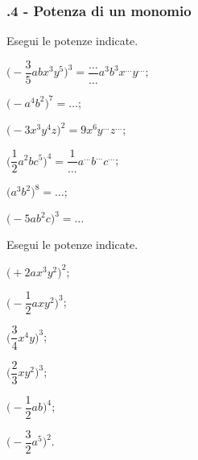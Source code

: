\subsubsection*{\thechapter.4 - Potenza di un monomio}
\begin{esercizio}
 \label{ese:10.16} %
 Esegui le potenze indicate.
\begin{multicols}{2}
\begin{enumeratea}
\spazielenx
 \item $\bigg(-{\dfrac{3}{5}}abx^{3}y^{5}\bigg)^{3}=\dfrac{\ldots }{\ldots}a^{3}b^{3}x^{\ldots }y^{\ldots}$;
 \item $\big(-a^{4}b^{2}\big)^{7}=\ldots$;
 \item $\bigg(-3x^{3}y^{4}z\bigg)^{2}=9x^{6}y^{\ldots }z^{\ldots }$;
 \item $\bigg(\dfrac{1}{2}a^{2}bc^{5}\bigg)^{4}=\dfrac{1}{\ldots}a^{\ldots}b^{\ldots}c^{\ldots}$;
 \item $\big(a^{3}b^{2}\big)^{8}=\ldots$;
 \item $\big(-5ab^{2}c\big)^{3}=\ldots$
\end{enumeratea}
\end{multicols}
\end{esercizio}

\begin{esercizio}
 \label{ese:10.17} %
 Esegui le potenze indicate.
\begin{multicols}{3}
\begin{enumeratea}
\spazielenx
 \item $\big(+2ax^{3}y^{2}\big)^{2}$;
 \item $\bigg(-{\dfrac{1}{2}}axy^{2}\bigg)^{3}$;
 \item $\bigg(\dfrac{3}{4}x^{4}y\bigg)^{3}$;
 \item $\bigg(\dfrac{2}{3}xy^{2}\bigg)^{3}$;
 \item $\bigg(-{\dfrac{1}{2}}ab\bigg)^{4}$;
 \item $\bigg(-{\dfrac{3}{2}}a^{5}\bigg)^{2}$.
\end{enumeratea}
\end{multicols}
\end{esercizio}


